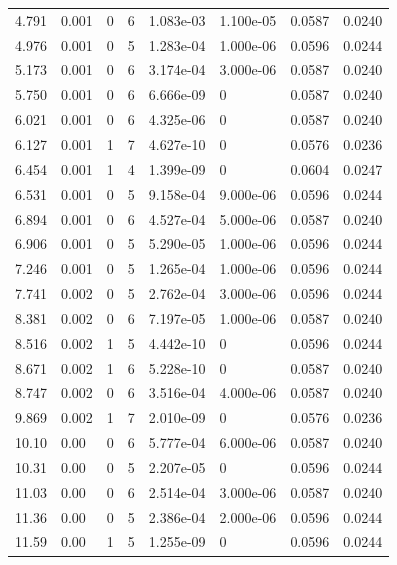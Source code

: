 \documentclass[preview]{standalone}
\begin{document}
{{\begin{tabular}{L{1.2cm}C{1.2cm} C{0.3cm}C{0.5cm} C{1.4cm}C{1.4cm} C{1.4cm}C{1.4cm}}
  4.791  &  0.001  & 0     &  6 &  1.083e-03  & 1.100e-05  & 0.0587 &  0.0240   \\ 
  4.976  &  0.001  & 0     &  5 &  1.283e-04  & 1.000e-06  & 0.0596 &  0.0244   \\ 
  5.173  &  0.001  & 0     &  6 &  3.174e-04  & 3.000e-06  & 0.0587 &  0.0240   \\ 
  5.750  &  0.001  & 0     &  6 &  6.666e-09  & 0  & 0.0587 &  0.0240   \\ 
  6.021  &  0.001  & 0     &  6 &  4.325e-06  & 0  & 0.0587 &  0.0240   \\ 
  6.127  &  0.001  & 1     &  7 &  4.627e-10  & 0  & 0.0576 &  0.0236   \\ 
  6.454  &  0.001  & 1     &  4 &  1.399e-09  & 0  & 0.0604 &  0.0247   \\ 
  6.531  &  0.001  & 0     &  5 &  9.158e-04  & 9.000e-06  & 0.0596 &  0.0244   \\ 
  6.894  &  0.001  & 0     &  6 &  4.527e-04  & 5.000e-06  & 0.0587 &  0.0240   \\ 
  6.906  &  0.001  & 0     &  5 &  5.290e-05  & 1.000e-06  & 0.0596 &  0.0244   \\ 
  7.246  &  0.001  & 0     &  5 &  1.265e-04  & 1.000e-06  & 0.0596 &  0.0244   \\ 
  7.741  &  0.002  & 0     &  5 &  2.762e-04  & 3.000e-06  & 0.0596 &  0.0244   \\ 
  8.381  &  0.002  & 0     &  6 &  7.197e-05  & 1.000e-06  & 0.0587 &  0.0240   \\ 
  8.516  &  0.002  & 1     &  5 &  4.442e-10  & 0  & 0.0596 &  0.0244   \\ 
  8.671  &  0.002  & 1     &  6 &  5.228e-10  & 0  & 0.0587 &  0.0240   \\ 
  8.747  &  0.002  & 0     &  6 &  3.516e-04  & 4.000e-06  & 0.0587 &  0.0240   \\ 
  9.869  &  0.002  & 1     &  7 &  2.010e-09  & 0  & 0.0576 &  0.0236   \\ 
  10.10  &  0.00  & 0     &  6 &  5.777e-04  & 6.000e-06  & 0.0587 &  0.0240   \\ 
  10.31  &  0.00  & 0     &  5 &  2.207e-05  & 0  & 0.0596 &  0.0244   \\ 
  11.03  &  0.00  & 0     &  6 &  2.514e-04  & 3.000e-06  & 0.0587 &  0.0240   \\ 
  11.36  &  0.00  & 0     &  5 &  2.386e-04  & 2.000e-06  & 0.0596 &  0.0244   \\ 
  11.59  &  0.00  & 1     &  5 &  1.255e-09  & 0  & 0.0596 &  0.0244   \\ 

\end{tabular}}}
\end{document}
